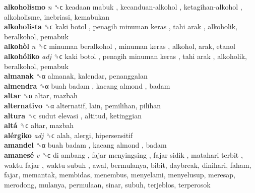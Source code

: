 \textbf{alkoholismo} \emph{n}  ␝ϲ   keadaan mabuk ,  kecanduan-alkohol ,  ketagihan-alkohol , alkoholisme, inebriasi, kemabukan  \\
\textbf{alkoholista} ␝ϲ   kaki botol ,  penagih minuman keras ,  tahi arak , alkoholik, beralkohol, pemabuk  \\
\textbf{alkohòl} \emph{n}  ␝ϲ   minuman beralkohol ,  minuman keras , alkohol, arak, etanol  \\
\textbf{alkohóliko} \emph{adj}  ␝ϲ   kaki botol ,  penagih minuman keras ,  tahi arak , alkoholik, beralkohol, pemabuk  \\
\textbf{almanak} ␝α  almanak, kalendar, penanggalan  \\
\textbf{almendra} ␝α   buah badam ,  kacang almond , badam  \\
\textbf{altar} ␝α  altar, mazbah  \\
\textbf{alternativo} ␝α  alternatif, lain, pemilihan, pilihan  \\
\textbf{altura} ␝ϲ   sudut elevasi , altitud, ketinggian  \\
\textbf{altá} ␝ϲ  altar, mazbah  \\
\textbf{alérgiko} \emph{adj}  ␝ϲ  alah, alergi, hipersensitif  \\
\textbf{amandel} ␝α   buah badam ,  kacang almond , badam  \\
\textbf{amanesé} \emph{v}  ␝ϲ   di ambang ,  fajar menyingsing ,  fajar sidik ,  matahari terbit ,  waktu fajar ,  waktu subuh , awal, bermulanya, bibit, daybreak, dinihari, faham, fajar, memantak, membidas, menembus, menyelami, menyelusup, meresap, merodong, mulanya, permulaan, sinar, subuh, terjeblos, terperosok  \\
